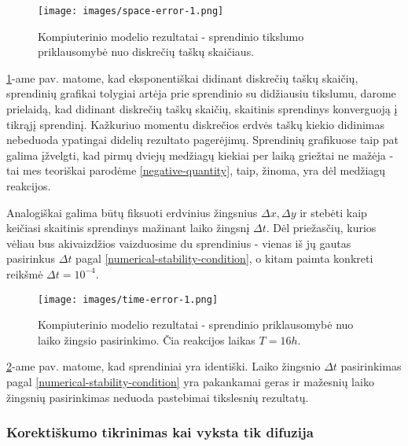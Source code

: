 \newpage

\begin{figure}[h!]
    \centering
    \texttt{[image: images/space-error-1.png]}

    \caption{Kompiuterinio modelio rezultatai - sprendinio tikslumo priklausomybė nuo diskrečių taškų skaičiaus. }

    \label{results-space-error}
\end{figure}

\ref{results-space-error}-ame pav. matome, kad eksponentiškai didinant diskrečių taškų skaičių, sprendinių grafikai tolygiai artėja prie sprendinio su didžiausiu tikslumu, darome prielaidą, kad didinant diskrečių taškų skaičių, skaitinis sprendinys konverguoją į tikrąjį sprendinį. Kažkuriuo momentu diskrečios erdvės taškų kiekio didinimas nebeduoda ypatingai didelių rezultato pagerėjimų. Sprendinių grafikuose taip pat galima įžvelgti, kad pirmų dviejų medžiagų kiekiai per laiką griežtai ne mažėja - tai mes teoriškai parodėme \eqref{negative-quantity}, taip, žinoma, yra dėl  medžiagų reakcijos. 

Analogiškai galima būtų fiksuoti erdvinius žingsnius $\Delta x, \Delta y$ ir stebėti kaip keičiasi skaitinis sprendinys mažinant laiko žingsnį $\Delta t$. Dėl priežasčių, kurios vėliau bus akivaizdžios vaizduosime du sprendinius - vienas iš jų gautas pasirinkus $\Delta t$ pagal \eqref{numerical-stability-condition}, o kitam paimta konkreti reikšmė $\Delta t = 10^{-4}$.


\begin{figure}[h!]

\centering

\texttt{[image: images/time-error-1.png]}

\caption{Kompiuterinio modelio rezultatai - sprendinio priklausomybė nuo laiko žingsio pasirinkimo. Čia reakcijos laikas $T=16h$.}

\label{time-error}

\end{figure}

\ref{time-error}-ame pav. matome, kad sprendiniai yra identiški. Laiko žingsnio  $\Delta t$ pasirinkimas pagal \eqref{numerical-stability-condition} yra pakankamai geras ir mažesnių laiko žingsnių pasirinkimas neduoda pastebimai tikslesnių rezultatų.

\newpage
\subsubsection*{Korektiškumo tikrinimas kai vyksta tik difuzija}

